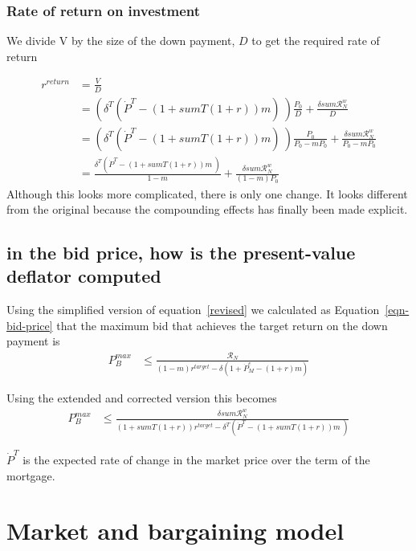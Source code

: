 \subsection{Rate of return on investment}
We divide V by the size of the down payment, $D$ to get the required rate of return  

\begin{align}
r^{return} 
  &= \frac{V}{D}  \nonumber \\
  &= \left(\delta^T \left(\dot P^T - (1 + sumT(1+r))m\right) \ \right) \frac{P_0}{D}  + \frac{\delta sum\mathcal{R}^w_N}{D}      \nonumber \\
  &= \left(\delta^T \left(\dot P^T - (1 + sumT(1+r))m \right) \ \right)\frac{P_0}{P_0-mP_0} +  \frac{\delta sum\mathcal{R}^w_N }{P_0-mP_0}  \\ 
  &= \frac{\delta^T \left(\dot P^T - (1 + sumT(1+r))m\ \right) }{1-m} +\frac{\delta sum\mathcal{R}^w_N }{(1-m)P_0}\label{revised}
\end{align}
Although this looks more complicated, there is only one change. It looks different from the original because the compounding effects has finally been made explicit.



\section{in the bid price, how is the present-value deflator computed}

Using the simplified version of equation~\ref{revised} we calculated  as Equation~\ref{eqn-bid-price} that the maximum bid that achieves the target return on the down payment is
\begin{align*}
P_B^{max} & \le    \frac{\mathcal{R}_N}{(1-m)r^{target}-\delta \left(1 + \dot P_M^e - (1+r)m\right)}  \end{align*}

Using the extended and corrected version this becomes
\begin{align}
P_B^{max} & \le    \frac{\delta sum\mathcal{R}^w_N } {(1 + sumT(1+r))r^{target}-\delta^T \left(\dot P^T - (1 + sumT(1+r))m\ \right)} \label{eqn-bid-revised} \end{align}

$\dot P^T$  is the expected rate of change in the market price over the term of the mortgage.

\chapter{Market and bargaining model}
